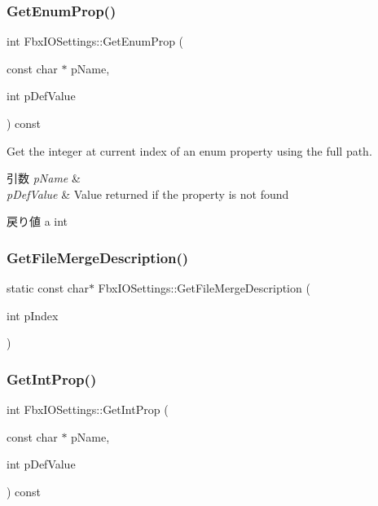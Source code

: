 \subsubsection{\texorpdfstring{Get\+Enum\+Prop()}{GetEnumProp()}\hspace{0.1cm}{\footnotesize\ttfamily [2/2]}}
{\footnotesize\ttfamily int Fbx\+I\+O\+Settings\+::\+Get\+Enum\+Prop (\begin{DoxyParamCaption}\item[{const char $\ast$}]{p\+Name,  }\item[{int}]{p\+Def\+Value }\end{DoxyParamCaption}) const}

Get the integer at current index of an enum property using the full path. 
\begin{DoxyParams}{引数}
{\em p\+Name} & \\
\hline
{\em p\+Def\+Value} & Value returned if the property is not found \\
\hline
\end{DoxyParams}
\begin{DoxyReturn}{戻り値}
a int 
\end{DoxyReturn}
\mbox{\label{class_fbx_i_o_settings_ac44253178e75301e554ee8350274247c}} 
\subsubsection{\texorpdfstring{Get\+File\+Merge\+Description()}{GetFileMergeDescription()}}
{\footnotesize\ttfamily static const char$\ast$ Fbx\+I\+O\+Settings\+::\+Get\+File\+Merge\+Description (\begin{DoxyParamCaption}\item[{int}]{p\+Index }\end{DoxyParamCaption})\hspace{0.3cm}{\ttfamily [static]}}

\mbox{\label{class_fbx_i_o_settings_a3ab14ccc4a1ecb92bc94c61597d50d08}} 
\subsubsection{\texorpdfstring{Get\+Int\+Prop()}{GetIntProp()}}
{\footnotesize\ttfamily int Fbx\+I\+O\+Settings\+::\+Get\+Int\+Prop (\begin{DoxyParamCaption}\item[{const char $\ast$}]{p\+Name,  }\item[{int}]{p\+Def\+Value }\end{DoxyParamCaption}) const}

